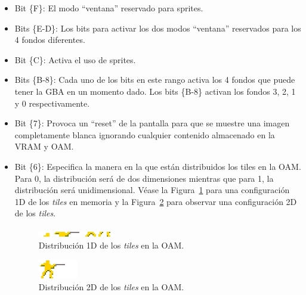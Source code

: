 \begin{itemize}
	\item Bit \{F\}: El modo ``ventana'' reservado para sprites.
	\item Bits \{E-D\}: Los bits para activar los dos modos ``ventana'' reservados para los 4 fondos diferentes.
	\item Bit \{C\}: Activa el uso de sprites.
	\item Bits \{B-8\}: Cada uno de los bits en este rango activa los 4 fondos que puede tener la GBA en un momento dado. Los bits \{B-8\} activan los fondos 3, 2, 1 y 0 respectivamente.
	\item Bit \{7\}: Provoca un ``reset'' de la pantalla para que se muestre una imagen completamente blanca ignorando cualquier contenido almacenado en la VRAM y OAM\@.
	\item Bit \{6\}: Especifica la manera en la que están distribuidos los tiles en la OAM\@. Para 0, la distribución será de dos dimensiones mientras que para 1, la distribución será unidimensional. Véase la Figura~\ref{fig:1d} para una configuración 1D de los \textit{tiles} en memoria y la Figura~\ref{fig:2d} para observar una configuración 2D de los \textit{tiles}.

		\begin{figure}[h]
			\centering
			\includegraphics[width=.7\textwidth]{capitulos/capitulo4/new_1d.png}
			\caption{Distribución 1D de los \textit{tiles} en la OAM.}\label{fig:1d}
		\end{figure}

		\begin{figure}[h]
			\centering
			\includegraphics[width=.4\textwidth]{capitulos/capitulo4/new_2d.png}
			\caption{Distribución 2D de los \textit{tiles} en la OAM.}\label{fig:2d}
		\end{figure}


\end{itemize}
